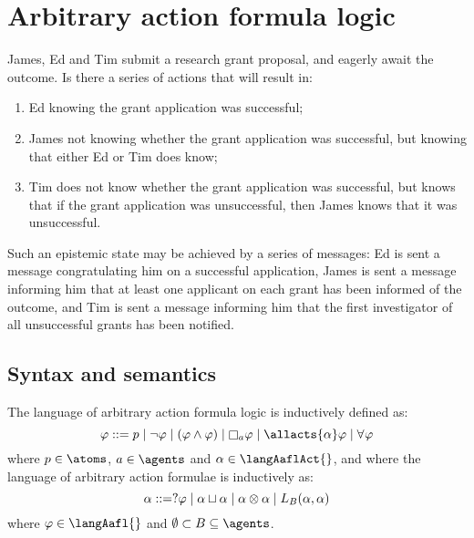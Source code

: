 \chapter{Arbitrary action formula logic}\label{aafl}

\begin{example}\label{grant-example}
James, Ed and Tim submit a research grant proposal, and eagerly await the outcome.
Is there a series of actions that will result in: 

\begin{enumerate}
  \item Ed knowing the grant application was successful; 
  \item James not knowing whether the grant application was successful, but knowing that either Ed or Tim does know;
  \item Tim does not know whether the grant application was successful, but knows that if the grant application was unsuccessful, then James knows that it was unsuccessful.
\end{enumerate}

Such an epistemic state may be achieved by a series of messages: Ed is sent a message congratulating him on a successful application, James is sent a message informing him that at least one applicant on each grant has been informed of the outcome, and Tim is sent a message informing him that the first investigator of all unsuccessful grants has been notified.
\end{example}

\section{Syntax and semantics}\label{aafl-semantics}

\begin{definition}
    The language \langAafl{} of arbitrary action formula logic is inductively defined as:
    $$
        \phi ::= \atomP \mid 
               \neg \phi \mid
               (\phi \land \phi) \mid
               \necessary[\agentA] \phi \mid
               \allacts{\alpha} \phi \mid
               \allrefs \phi
    $$
    where $\atomP \in \atoms$, $\agentA \in \agents$ and $\alpha \in \langAaflAct{}$, and where the language \langAaflAct{} of arbitrary action formulae is inductively as:
    $$
        \alpha ::= ?{\varphi} \mid
               \alpha \sqcup \alpha \mid
               \alpha \otimes \alpha \mid
               L_B (\alpha, \alpha)
    $$
    where $\phi \in \langAafl{}$ and $\emptyset \subset \agentsB \subseteq \agents$.
\end{definition}

